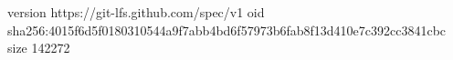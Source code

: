 version https://git-lfs.github.com/spec/v1
oid sha256:4015f6d5f0180310544a9f7abb4bd6f57973b6fab8f13d410e7c392cc3841cbc
size 142272

